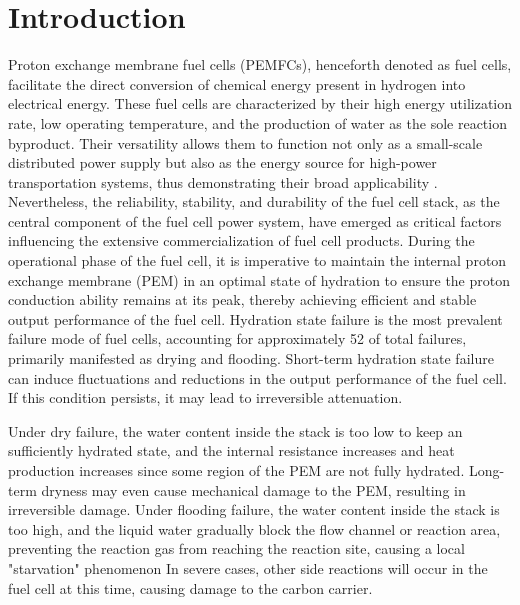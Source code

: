 \section{Introduction}
Proton exchange membrane fuel cells (PEMFCs), henceforth denoted as fuel cells, facilitate the direct conversion of chemical energy present in hydrogen into electrical energy.
These fuel cells are characterized by their high energy utilization rate, low operating temperature, and the production of water as the sole reaction byproduct.
Their versatility allows them to function not only as a small-scale distributed power supply but also as the energy source for high-power transportation systems, thus demonstrating their broad applicability \cite{sharafOverviewFuelCell2014} .
Nevertheless, the reliability, stability, and durability of the fuel cell stack, as the central component of the fuel cell power system, have emerged as critical factors influencing the extensive commercialization of fuel cell products.
During the operational phase of the fuel cell, it is imperative to maintain the internal proton exchange membrane (PEM) in an optimal state of hydration to ensure the proton conduction ability remains at its peak, thereby achieving efficient and stable output performance of the fuel cell. Hydration state failure is the most prevalent failure mode of fuel cells, accounting for approximately 52 of total failures, primarily manifested as drying and flooding. Short-term hydration state failure can induce fluctuations and reductions in the output performance of the fuel cell. If this condition persists, it may lead to irreversible attenuation.
\par
Under dry failure, the water content inside the stack is too low to keep an sufficiently hydrated state,
and the internal resistance increases and heat production increases since some region of the PEM are not fully hydrated.
Long-term dryness may even cause mechanical damage to the PEM, resulting in irreversible damage\cite{pattersonDamageCathodeCatalyst2006}.
Under flooding failure, the water content inside the stack is too high, and the liquid water gradually block the flow channel or reaction area,
preventing the reaction gas from reaching the reaction site, causing a local "starvation" phenomenon\cite{chuExperimentalStudyInfluence2022,ohsModelingHydrogenStarvation2011}
In severe cases, other side reactions  will occur in the fuel cell at this time, causing damage to the carbon carrier\cite{ohsModelingHydrogenStarvation2011,kuracinaStudySelectedCharacteristics2014,jiaMitigationStrategiesHydrogen2017}. 
